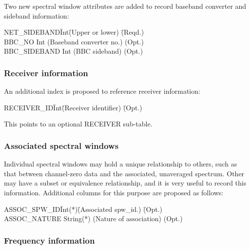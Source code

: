 \documentclass{article}
\begin{document}
Two new spectral window attributes are added to record baseband
converter and sideband information:

\begin{tabbing}
NET\_SIDEBAND\quad\quad \= Int\quad\quad \= 
(Upper or lower) \quad\quad\quad\quad\quad \= (Reqd.) \\
BBC\_NO           \> Int  \> 
(Baseband converter no.) \> (Opt.) \\
BBC\_SIDEBAND     \> Int \>
(BBC sideband) \> (Opt.) \\
\end{tabbing}

\subsubsection{Receiver information}

An additional index is proposed to reference receiver information:

\begin{tabbing}
RECEIVER\_ID\quad\quad \= Int\quad\quad \= 
(Receiver identifier) \quad\quad\quad\quad\quad \= (Opt.) \\
\end{tabbing}

This points to an optional RECEIVER sub-table.

\subsubsection{Associated spectral windows}

Individual spectral windows may hold a unique relationship to others,
such as that between channel-zero data and the associated, unaveraged
spectrum. Other may have a subset or equivalence relationship, and it
is very useful to record this information. Additional columns for this
purpose are proposed as follows:

\begin{tabbing}
ASSOC\_SPW\_ID\quad\quad \= Int(*)\quad\quad \= 
(Associated spw\_id.) \quad\quad\quad\quad\quad \= (Opt.) \\
ASSOC\_NATURE           \> String(*)  \> 
(Nature of association) \> (Opt.) \\
\end{tabbing}

\subsubsection{Frequency information}
\end{document}
